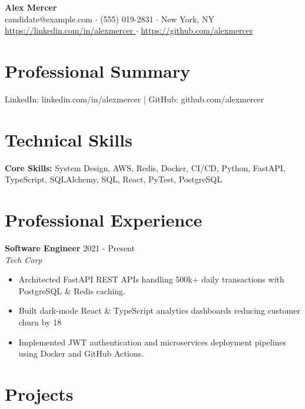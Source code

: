 \documentclass[11pt,a4paper]{article}
\begin{document}
\begin{center}
    {\Large \textbf{ Alex Mercer }} \\
    \vspace{2pt}
    \small candidate@example.com $\cdot$ (555) 019-2831 $\cdot$ New York, NY \\
    \small \url{ https://linkedin.com/in/alexmercer } $\cdot$ \url{ https://github.com/alexmercer }
\end{center}

\vspace{-10pt}

\section*{Professional Summary}
LinkedIn: linkedin.com/in/alexmercer | GitHub: github.com/alexmercer

\section*{Technical Skills}
\textbf{Core Skills:} System Design, AWS, Redis, Docker, CI/CD, Python, FastAPI, TypeScript, SQLAlchemy, SQL, React, PyTest, PostgreSQL

\section*{Professional Experience}

\noindent \textbf{ Software Engineer } \hfill 2021 - Present \\
\textit{ Tech Corp } \hfill \textit{  }
\begin{itemize}[leftmargin=1.5em, noitemsep, topsep=2pt]
    
    \item Architected FastAPI REST APIs handling 500k+ daily transactions with PostgreSQL & Redis caching.
    
    \item Built dark-mode React & TypeScript analytics dashboards reducing customer churn by 18%
    
    \item Implemented JWT authentication and microservices deployment pipelines using Docker and GitHub Actions.
    
\end{itemize}
\vspace{4pt}


\section*{Projects}
\end{document}
